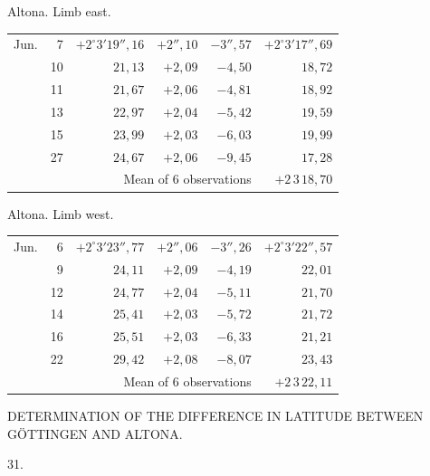 \noindent\begin{minipage}[t]{.495\textwidth}\centering Altona. Limb east.\par\smallskip
{\scriptsize\setlength{\tabcolsep}{1pt}\renewcommand{\arraystretch}{1.2}\begin{tabular}{lr|r|r|r|r|}
Jun.&7&$+2^\circ3'19''{,}16$&$+2''{,}10$&$-3''{,}57$&$+2^\circ3'17''{,}69$\\
&10&$21{,}13$&$+2{,}09$&$-4{,}50$&$18{,}72$\\
&11&$21{,}67$&$+2{,}06$&$-4{,}81$&$18{,}92$\\
&13&$22{,}97$&$+2{,}04$&$-5{,}42$&$19{,}59$\\
&15&$23{,}99$&$+2{,}03$&$-6{,}03$&$19{,}99$\\
&27&$24{,}67$&$+2{,}06$&$-9{,}45$&$17{,}28$\\
\cline{6-6}\multicolumn{5}{r}{Mean of 6 observations}&$+2\,3\,18{,}70$
\end{tabular}}\end{minipage}\hfill\begin{minipage}[t]{.495\textwidth}\centering Altona. Limb west.\par\smallskip
{\scriptsize\setlength{\tabcolsep}{1pt}\renewcommand{\arraystretch}{1.2}\begin{tabular}{lr|r|r|r|r}
Jun.&6&$+2^\circ3'23''{,}77$&$+2''{,}06$&$-3''{,}26$&$+2^\circ3'22''{,}57$\\
&9&$24{,}11$&$+2{,}09$&$-4{,}19$&$22{,}01$\\
&12&$24{,}77$&$+2{,}04$&$-5{,}11$&$21{,}70$\\
&14&$25{,}41$&$+2{,}03$&$-5{,}72$&$21{,}72$\\
&16&$25{,}51$&$+2{,}03$&$-6{,}33$&$21{,}21$\\
&22&$29{,}42$&$+2{,}08$&$-8{,}07$&$23{,}43$\\
\cline{6-6}\multicolumn{5}{r}{Mean of 6 observations}&$+2\,3\,22{,}11$
\end{tabular}}\end{minipage}
\par\vspace{4mm}

\clearpage
\noindent{}\parbox[t]{\dimexpr\textwidth-10mm\relax}{\centering\scriptsize DETERMINATION OF THE DIFFERENCE IN LATITUDE BETWEEN GÖTTINGEN AND ALTONA.}\par
\begin{center}31.\end{center}


